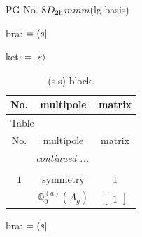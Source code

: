 \documentclass[fleqn,8pt,landscape]{jsarticle}
\begin{document}
\setcounter{MaxMatrixCols}{32}

\renewcommand{\tablename}{Table~}
\renewcommand{\figurename}{Figure~}
\begin{center}
\LARGE
PG No. 8\quad$D_{\rm 2h}$\quad$mmm$\quad[ orthorhombic ] (lg basis)
\end{center}
bra: $=\bra{s}$

\noindent
ket: $=\ket{s}$
\renewcommand{\arraystretch}{1.6}
\begin{longtable}{ccc}
\caption{(s,s) block.}
 \\
 \hline \hline
No. & multipole & matrix \\ \hline \endfirsthead

\multicolumn{2}{l}{\tablename\ \thetable{}} \\
 \hline \hline
No. & multipole & matrix \\ \hline \endhead

 \hline \hline
\multicolumn{2}{r}{\footnotesize\it continued ...} \\ \endfoot

 \hline \hline
\multicolumn{2}{r}{} \\ \endlastfoot

$ 1 $ & $ \text{symmetry} $ & $ 1 $ \\
$  $ & $ \mathbb{Q}_{0}^{(a)}(A_{g}) $ & $ \begin{bmatrix} 1 \end{bmatrix} $ \\ \hline
\end{longtable}
bra: $=\bra{s}$
\end{document}
